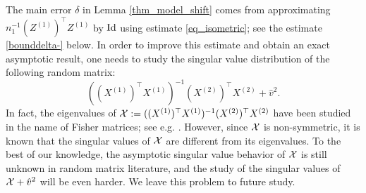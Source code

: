 The main error $\delta$ in Lemma \ref{thm_model_shift} comes from approximating $n_1^{-1}(Z^{(1)})^{\top}Z^{(1)}$ by $\id$ using estimate \eqref{eq_isometric}; see the estimate \eqref{bounddelta-} below. In order to improve this estimate and obtain an exact asymptotic result, one needs to study the singular value distribution of the following random matrix:
$$((X^{(1)})^{\top}X^{(1)})^{-1}(X^{(2)})^{\top}X^{(2)} +  \hat{v}^2 .$$
In fact, the eigenvalues of $\cal X:=((X^{(1)})^{\top}X^{(1)})^{-1}(X^{(2)})^{\top}X^{(2)}$ have been studied in the name of Fisher matrices; see e.g. \cite{Fmatrix}. However, since $\cal X$ is non-symmetric, it is known that the singular values of $\cal X$ are different from its eigenvalues. To the best of our knowledge, the asymptotic singular value behavior of $\cal X$ is still unknown in random matrix literature, and the study of the singular values of $\cal X +\hat v^2$ will be even harder. We leave this problem to future study.






